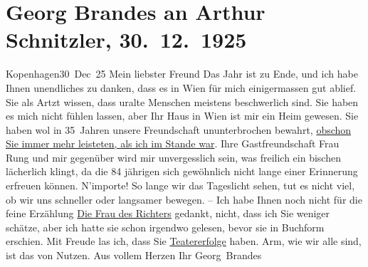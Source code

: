

         
         \renewcommand{\erwaehntePersonen}{Personen: Gertrud Rung}
         \renewcommand{\erwaehnteOrte}{Orte: Kopenhagen, Wien}
         \renewcommand{\erwaehnteWerke}{Werke: Die Frau des Richters. Novelle}
               \section[Georg Brandes an Arthur Schnitzler, 30. 12. 1925]{ Georg Brandes an Arthur Schnitzler, 30. 12. 1925}\nopagebreak{}\rehead{ }\begin{ledgroupsized}[t]{13cm}\normalsize\beginnumbering \toendnotes[C]{\smallbreak\pagebreak[2]} 
\pstart
           \raggedleft{}{\pb}Kopenhagen30 Dec 25\pend
           \pstart{}Mein liebster Freund\pend\pstart
           Das Jahr ist zu Ende, und ich habe Ihnen unendliches zu danken, dass es in Wien für mich einigermassen gut ablief. Sie als
               Artzt wissen, dass uralte Menschen meistens beschwerlich sind. Sie haben es mich
               nicht fühlen lassen, aber Ihr Haus in Wien ist mir
               ein Heim gewesen. Sie haben wol in 35 Jahren unsere Freundschaft ununterbrochen
               bewahrt, \uline{obschon Sie immer mehr leisteten, als ich im
                  Stande war}. Ihre Gastfreundschaft Frau Rung und mir {\pb}gegenüber
               wird mir unvergesslich sein, was freilich ein bischen lächerlich klingt, da die 84
               jährigen sich gewöhnlich nicht lange einer Erinnerung erfreuen können.\pend
           \pstart
           N’importe! So lange wir das Tageslicht sehen, tut es nicht viel, ob wir uns schneller
               oder langsamer bewegen. – Ich habe Ihnen noch nicht für die feine Erzählung \uline{Die Frau des Richters} gedankt, nicht, dass ich Sie weniger schätze, aber ich hatte sie schon irgendwo
               gelesen, bevor sie in Buchform erschien. Mit Freude las ich, dass Sie \uline{Teatererfolge} haben. Arm, wie wir alle sind, ist das
               von Nutzen. Aus vollem Herzen\pend
           \pstart Ihr \spacefill\mbox{Georg Brandes}\pend{}
         

\end{ledgroupsized}
